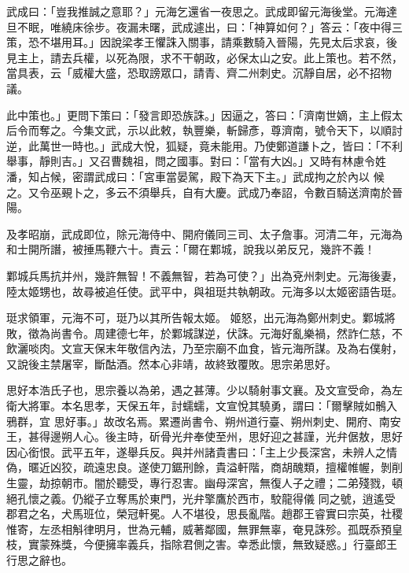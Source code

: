 \begin{pinyinscope}
 武成曰：「豈我推誠之意耶？」元海乞還省一夜思之。武成即留元海後堂。元海達旦不眠，唯繞床徐步。夜漏未曙，武成遽出，曰：「神算如何？」答云：「夜中得三策，恐不堪用耳。」因說梁孝王懼誅入關事，請乘數騎入晉陽，先見太后求哀，後見主上，請去兵權，以死為限，求不干朝政，必保太山之安。此上策也。若不然，
 當具表，云「威權大盛，恐取謗眾口，請青、齊二州刺史。沉靜自居，必不招物議。



 此中策也。」更問下策曰：「發言即恐族誅。」因逼之，答曰：「濟南世嫡，主上假太后令而奪之。今集文武，示以此敕，執豐樂，斬歸彥，尊濟南，號令天下，以順討逆，此萬世一時也。」武成大悅，狐疑，竟未能用。乃使鄭道謙卜之，皆曰：「不利舉事，靜則吉。」又召曹魏祖，問之國事。對曰：「當有大凶。」又時有林慮令姓潘，知占候，密謂武成曰：「宮車當晏駕，殿下為天下主。」武成拘之於內以
 候之。又令巫覡卜之，多云不須舉兵，自有大慶。武成乃奉詔，令數百騎送濟南於晉陽。



 及孝昭崩，武成即位，除元海侍中、開府儀同三司、太子詹事。河清二年，元海為和士開所譖，被捶馬鞭六十。責云：「爾在鄴城，說我以弟反兄，幾許不義！



 鄴城兵馬抗并州，幾許無智！不義無智，若為可使？」出為兗州刺史。元海後妻，陸太姬甥也，故尋被追任使。武平中，與祖珽共執朝政。元海多以太姬密語告珽。



 珽求領軍，元海不可，珽乃以其所告報太姬。
 姬怒，出元海為鄭州刺史。鄴城將敗，徵為尚書令。周建德七年，於鄴城謀逆，伏誅。元海好亂樂禍，然詐仁慈，不飲灑啖肉。文宣天保末年敬信內法，乃至宗廟不血食，皆元海所謀。及為右僕射，又說後主禁屠宰，斷酤酒。然本心非靖，故終致覆敗。思宗弟思好。



 思好本浩氏子也，思宗養以為弟，遇之甚薄。少以騎射事文襄。及文宣受命，為左衛大將軍。本名思孝，天保五年，討蠕蠕，文宣悅其驍勇，謂曰：「爾擊賊如鶻入鴉群，宜
 思好事。」故改名焉。累遷尚書令、朔州道行臺、朔州刺史、開府、南安王，甚得邊朔人心。後主時，斫骨光弁奉使至州，思好迎之甚謹，光弁倨敖，思好因心銜恨。武平五年，遂舉兵反。與并州諸貴書曰：「主上少長深宮，未辨人之情偽，暱近凶狡，疏遠忠良。遂使刀鋸刑餘，貴溢軒階，商胡醜類，擅權帷幄，剝削生靈，劫掠朝市。闇於聽受，專行忍害。幽母深宮，無復人子之禮；二弟殘戮，頓絕孔懷之義。仍縱子立奪馬於東門，光弁擎鷹於西市，駮龍得儀
 同之號，逍遙受郡君之名，犬馬班位，榮冠軒冕。人不堪役，思長亂階。趙郡王睿實曰宗英，社稷惟寄，左丞相斛律明月，世為元輔，威著鄰國，無罪無辜，奄見誅殄。孤既忝預皇枝，實蒙殊獎，今便擁率義兵，指除君側之害。幸悉此懷，無致疑惑。」行臺郎王行思之辭也。




\end{pinyinscope}
